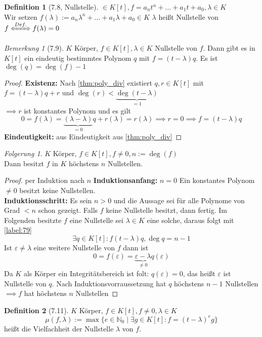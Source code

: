 \documentclass[a4paper]{scrartcl}
\DeclareMathOperator{\Exists}{\exists}
\theoremstyle{definition}
\newtheorem{defn}{Definition}
\theoremstyle{plain}
\theoremstyle{plain}
\theoremstyle{remark}
\newtheorem{remark}{Bemerkung}
\theoremstyle{remark}
\theoremstyle{remark}
\newtheorem{conc}{Folgerung}
\theoremstyle{remark}
\theoremstyle{remark}
\begin{document}
\begin{defn}[7.8, Nullstelle]
$\in K[t], f = a_n t^n + \ldots + a_1 t + a_0, \lambda \in K$ \\
  Wir setzen $f(\lambda) := a_n \lambda^n + \ldots + a_1\lambda + a_0 \in K$
$\lambda$ heißt Nullstelle von $f \xLeftrightarrow{Def.} f(\lambda) = 0$
\end{defn}
\begin{remark}[7.9]
\label{remark:79}
$K$ Körper, $f\in K[t], \lambda \in K$ Nullstelle von $f$. Dann gibt es in $K[t]$ ein eindeutig bestimmtes Polynom $q$ mit $f = (t - \lambda)q$.
Es ist $\deg(q) = \deg(f) - 1$
\end{remark}
\begin{proof}
\textbf{Existenz:} Nach \ref{thm:poly_div} existiert $q,r\in K[t]$ mit $f = (t - \lambda)q + r$ und $\deg(r) < \underbrace{\deg(t - \lambda)}_{= 1}$ \\
  $\implies r$ ist konstantes Polynom und es gilt
\[0 = f(\lambda) = \underbrace{(\lambda - \lambda)}_{= 0} q + r(\lambda) = r(\lambda) \implies r = 0 \implies f = (t - \lambda) q\]
\textbf{Eindeutigkeit:} aus Eindeutigkeit aus \ref{thm:poly_div}
\end{proof}
\begin{conc}
$K$ Körper, $f\in K[t], f\neq 0, n:= \deg(f)$ \\
  Dann besitzt $f$ in $K$ höchstens $n$ Nullstellen.
\end{conc}
\begin{proof}
per Induktion nach $n$
\textbf{Induktionsanfang:} $n = 0$ Ein konstantes Polynom $\neq 0$ besitzt keine Nullstellen. \\
  \textbf{Induktionsschritt:} Es sein $n > 0$ und die Aussage sei für alle Polynome von Grad $< n$ schon gezeigt.
Falls $f$ keine Nullstelle besitzt, dann fertig.
Im Folgenden besitzte $f$ eine Nullstelle sei $\lambda \in K$ eine solche, daraus folgt mit \ref{label:79}
\[\exists q\in K[t]: f(t - \lambda)q, \deg{q} = n - 1\]
Ist $\varepsilon \neq \lambda$ eine weitere Nullstelle von $f$ dann ist
\[0 = f(\varepsilon) = \underbrace{\varepsilon - \lambda}_{\neq 0}q(\varepsilon)\]
Da $K$ als Körper ein Integritätsbereich ist folt: $q(\varepsilon) = 0$, das heißt $\varepsilon$ ist Nullstelle von $q$.
Nach Induktionsvorraussetzung hat $q$ höchstens $n-1$ Nullstellen $\implies f$ hat höchstens $n$ Nullstellen
\end{proof}
\begin{defn}[7.11]
\label{dfn:zero}
$K$ Körper, $f\in K[t], f\neq 0,\lambda \in K$
\[\mu (f,\lambda) := \max\{e\in\mathbb{N}_0 \mid \Exists g\in K[t]: f = (t - \lambda)^e g\}\]
heißt die Vielfachheit der Nullstelle $\lambda$ von $f$.
\end{defn}
\end{document}
